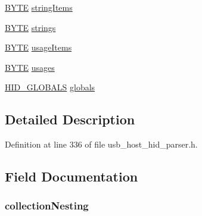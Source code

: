 \begin{DoxyCompactItemize}
\item 
\hyperlink{_generic_type_defs_8h_a4ae1dab0fb4b072a66584546209e7d58}{B\+Y\+T\+E} \hyperlink{struct___u_s_b___h_i_d___d_e_v_i_c_e___r_p_t___i_n_f_o_ab4ab301d12e4fda06883c464e55f2f46}{string\+Items}
\item 
\hyperlink{_generic_type_defs_8h_a4ae1dab0fb4b072a66584546209e7d58}{B\+Y\+T\+E} \hyperlink{struct___u_s_b___h_i_d___d_e_v_i_c_e___r_p_t___i_n_f_o_a3f4e33eea1303919d78e860314093395}{strings}
\item 
\hyperlink{_generic_type_defs_8h_a4ae1dab0fb4b072a66584546209e7d58}{B\+Y\+T\+E} \hyperlink{struct___u_s_b___h_i_d___d_e_v_i_c_e___r_p_t___i_n_f_o_ae443eb226a165cd8e906d6135bf3c0e8}{usage\+Items}
\item 
\hyperlink{_generic_type_defs_8h_a4ae1dab0fb4b072a66584546209e7d58}{B\+Y\+T\+E} \hyperlink{struct___u_s_b___h_i_d___d_e_v_i_c_e___r_p_t___i_n_f_o_a5a827ee628f6e4d6953ee6af48b51ff3}{usages}
\item 
\hyperlink{usb__host__hid__parser_8h_a7c40331ec98442072d8952931f11998f}{H\+I\+D\+\_\+\+G\+L\+O\+B\+A\+L\+S} \hyperlink{struct___u_s_b___h_i_d___d_e_v_i_c_e___r_p_t___i_n_f_o_aa69061cf5628301cde207cb1add04937}{globals}
\end{DoxyCompactItemize}


\subsection{Detailed Description}


Definition at line 336 of file usb\+\_\+host\+\_\+hid\+\_\+parser.\+h.



\subsection{Field Documentation}
\hypertarget{struct___u_s_b___h_i_d___d_e_v_i_c_e___r_p_t___i_n_f_o_a0f8ed983d59319581a328bb5be557a1e}{}
\subsubsection[{collection\+Nesting}]{ collection\+Nesting}\label{struct___u_s_b___h_i_d___d_e_v_i_c_e___r_p_t___i_n_f_o_a0f8ed983d59319581a328bb5be557a1e}


